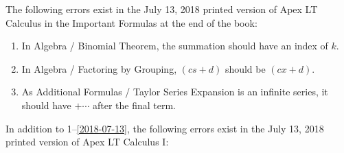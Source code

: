 \documentclass{amsart}
\begin{document}

The following errors exist in the July 13, 2018 printed version of Apex LT Calculus in the Important Formulas at the end of the book:
\begin{enumerate}
\item In Algebra / Binomial Theorem, the summation should have an index of $k$.
\item In Algebra / Factoring by Grouping, $(cs+d)$ should be $(cx+d)$.
\item As Additional Formulas / Taylor Series Expansion is an infinite series, it should have $+\dotsb$ after the final term.
\label{2018-07-13}
\end{enumerate}\bigskip

In addition to 1--\ref{2018-07-13}, the following errors exist in the July 13, 2018 printed version of Apex LT Calculus I:
\end{document}
